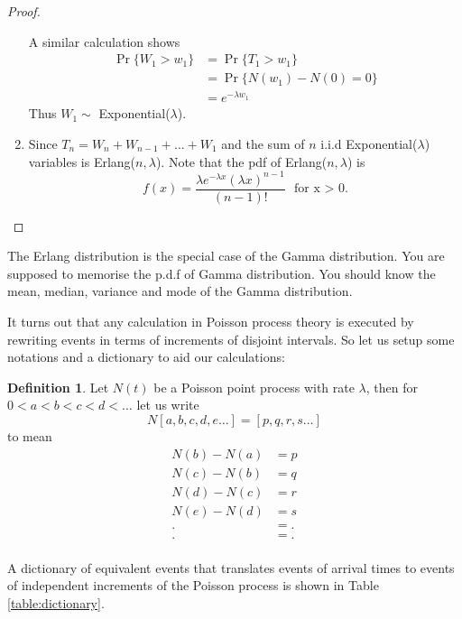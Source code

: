 \documentclass[letterpaper, 12pt]{article}
\newcommand{\1}{\mathds{1}} %
\theoremstyle{definition}
\newtheorem{definition}[theorem]{Definition}
\begin{document}
\begin{proof}
\begin{enumerate}
A similar calculation shows 
\begin{align*}
\Pr\{W_1 > w_1\} &= \Pr\{T_1 > w_1\}\\
&= \Pr\{ N(w_1)-N(0)=0\}\\
&= e^{-\lambda w_1}
\end{align*}
Thus $W_1\sim$ Exponential($\lambda$).

\item Since $T_n = W_n+W_{n-1}+\ldots+W_1$ and the sum of $n$ i.i.d Exponential($\lambda$) variables is Erlang($n,\lambda$). Note that the pdf of Erlang($n,\lambda$) is 
\[f(x) = \dfrac{\lambda e^{-\lambda x} (\lambda x)^{n-1}}{(n-1)!} \,\, \text{ for x > 0}.\]
\end{enumerate}
\end{proof}
The Erlang distribution is the special case of the Gamma distribution. You are supposed to memorise the p.d.f of Gamma distribution. You should know the mean, median, variance and mode of the Gamma distribution.

It turns out that any calculation in Poisson process theory is executed by rewriting events in terms of increments of disjoint intervals. So let us setup some notations and a dictionary to aid our calculations:

\begin{definition}
    \label{defn:incrementnotation}
    Let $N(t)$ be a Poisson point process with rate $\lambda$, then for $0 < a < b < c < d < \ldots$ let us write \[ N[a,b,c,d,e\ldots] = [p,q,r,s\ldots]\] to mean \begin{align*}
                              N(b)-N(a)&=p\\
                              N(c)-N(b)&=q\\
                              N(d)-N(c)&=r\\
                              N(e)-N(d)&=s\\
                              .&=.\\
                              .&=.\\\end{align*}
\end{definition}

A dictionary of equivalent events that translates events of arrival times to events of independent increments of the Poisson process is shown in Table \ref{table:dictionary}.
\end{document}
